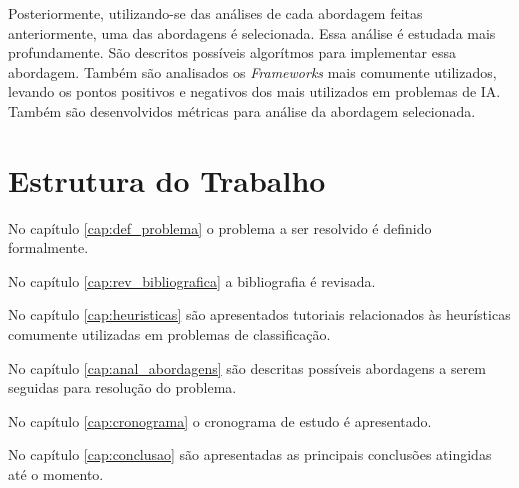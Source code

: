 Posteriormente, utilizando-se das análises de cada abordagem feitas anteriormente,
uma das abordagens é selecionada. Essa análise é estudada mais profundamente.
São descritos possíveis algorítmos para implementar essa abordagem. Também são
analisados os \textit{Frameworks} mais comumente utilizados, levando os pontos
positivos e negativos dos mais utilizados em problemas de IA. Também são
desenvolvidos métricas para análise da abordagem selecionada.


\section{Estrutura do Trabalho}

No capítulo \ref{cap:def_problema} o problema a ser resolvido é definido formalmente.

No capítulo \ref{cap:rev_bibliografica} a bibliografia é revisada.

No capítulo \ref{cap:heuristicas} são apresentados tutoriais relacionados às
heurísticas comumente utilizadas em problemas de classificação.

No capítulo \ref{cap:anal_abordagens} são descritas possíveis abordagens a serem
seguidas para resolução do problema.

No capítulo \ref{cap:cronograma} o cronograma de estudo é apresentado.

No capítulo \ref{cap:conclusao} são apresentadas as principais conclusões atingidas
até o momento.
